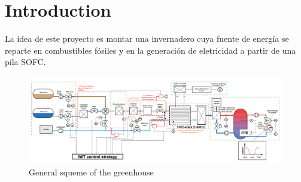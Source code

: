 \chapter*{Introduction}

La idea de este proyecto es montar una invernadero cuya fuente de energía se reparte en combustibles fósiles y en la generación de eletricidad a partir de una pila SOFC.

\begin{figure}[!ht]
    \centering
    \includegraphics[scale=0.3]{img/totalsys.png}
    \caption{General squeme of the greenhouse}
\end{figure}